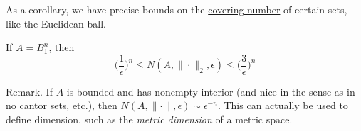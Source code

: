 As a corollary, we have precise bounds on the \hyperref[def:covering-number]{covering number} of certain sets, like the Euclidean ball. 

\begin{corollary}
  \label{thm:covering-numbers-of-the-unit-ball}
  If $A = B_1^n$, then 
	\begin{equation}
		\bigg(\frac{1}{\epsilon} \bigg)^n \leq N(A, \|\cdot\|_2, \epsilon) \leq \bigg( \frac{3}{\epsilon} \bigg)^n
	\end{equation}
\end{corollary}

Remark. If $A$ is bounded and has nonempty interior (and nice in the sense as in no cantor sets, etc.), then $N(A, \|\cdot\|, \epsilon) \sim \epsilon^{-n}$. This can actually be used to define dimension, such as the \textit{metric dimension} of a metric space. 

